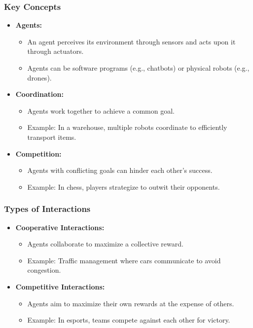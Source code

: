 \documentclass[aspectratio=169]{beamer}
\begin{document}
\begin{frame}[fragile]
    \frametitle{Key Concepts}
    \begin{itemize}
        \item \textbf{Agents:}
        \begin{itemize}
            \item An agent perceives its environment through sensors and acts upon it through actuators.
            \item Agents can be software programs (e.g., chatbots) or physical robots (e.g., drones).
        \end{itemize}
        \item \textbf{Coordination:}
        \begin{itemize}
            \item Agents work together to achieve a common goal.
            \item Example: In a warehouse, multiple robots coordinate to efficiently transport items.
        \end{itemize}
        \item \textbf{Competition:}
        \begin{itemize}
            \item Agents with conflicting goals can hinder each other's success.
            \item Example: In chess, players strategize to outwit their opponents.
        \end{itemize}
    \end{itemize}
\end{frame}

\begin{frame}[fragile]
    \frametitle{Types of Interactions}
    \begin{itemize}
        \item \textbf{Cooperative Interactions:}
        \begin{itemize}
            \item Agents collaborate to maximize a collective reward.
            \item Example: Traffic management where cars communicate to avoid congestion.
        \end{itemize}
        \item \textbf{Competitive Interactions:}
        \begin{itemize}
            \item Agents aim to maximize their own rewards at the expense of others.
            \item Example: In esports, teams compete against each other for victory.
        \end{itemize}
    \end{itemize}
\end{frame}
\end{document}
